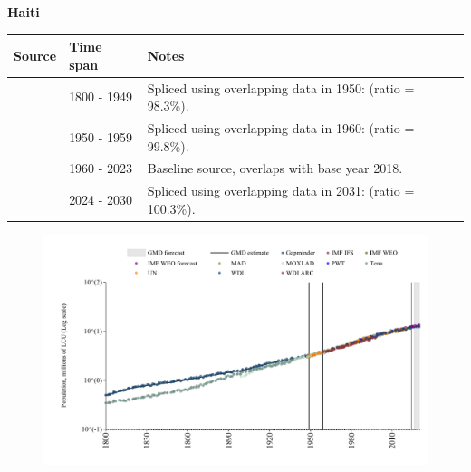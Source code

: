 \documentclass[12pt,a4paper,landscape]{article}
\begin{document}
\begin{adjustbox}{max totalsize={\paperwidth}{\paperheight},center}
\begin{minipage}[t][\textheight][t]{\textwidth}
\vspace*{0.5cm}
{}
\begin{center}
{\Large\bfseries Haiti}
\end{center}
\vspace{0.5cm}
\begin{table}[H]
\centering
\small
\begin{tabular}{|l|l|l|}
\hline
\textbf{Source} & \textbf{Time span} & \textbf{Notes} \\
\hline
\rowcolor{white}\cite{Gapminder}& 1800 - 1949 &Spliced using overlapping data in 1950: (ratio = 98.3\%).\\
\rowcolor{lightgray}\cite{IMF_IFS}& 1950 - 1959 &Spliced using overlapping data in 1960: (ratio = 99.8\%).\\
\rowcolor{white}\cite{WDI}& 1960 - 2023 &Baseline source, overlaps with base year 2018.\\
\rowcolor{lightgray}\cite{Gapminder}& 2024 - 2030 &Spliced using overlapping data in 2031: (ratio = 100.3\%).\\
\hline
\end{tabular}
\end{table}
\begin{figure}[H]
\centering
\includegraphics[width=\textwidth,height=0.6\textheight,keepaspectratio]{graphs/HTI_pop.pdf}
\end{figure}
\end{minipage}
\end{adjustbox}
\end{document}
